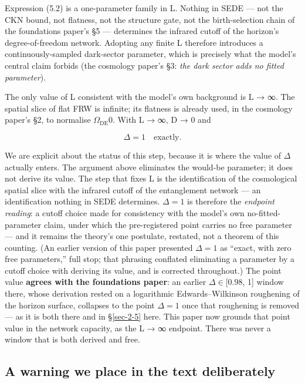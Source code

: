 \documentclass[aps,prd,preprint,nofootinbib,superscriptaddress]{revtex4-2}
\begin{document}
Expression (5.2) is a one-parameter family in L. Nothing in SEDE --- not
the CKN bound, not flatness, not the structure gate, not the
birth-selection chain of the foundations paper's §5 --- determines the
infrared cutoff of the horizon's degree-of-freedom network. Adopting any
finite L therefore introduces a continuously-sampled dark-sector
parameter, which is precisely what the model's central claim forbids
(the cosmology paper's §3: \emph{the dark sector adds no fitted
parameter}).

The only value of L consistent with the model's own background is L → ∞.
The spatial slice of flat FRW is infinite; its flatness is already used,
in the cosmology paper's §2, to normalise \(\Omega _\mathrm{DE}0\). With
L → ∞, D → 0 and

\begin{equation}\Delta = 1 \quad\text{exactly.} \tag{5.3}\end{equation}

We are explicit about the status of this step, because it is where the
value of \(\Delta\) actually enters. The argument above eliminates the
would-be parameter; it does not derive its value. The step that fixes L
is the identification of the cosmological spatial slice with the
infrared cutoff of the entanglement network --- an identification
nothing in SEDE determines. \(\Delta  = 1\) is therefore the
\emph{endpoint reading}: a cutoff choice made for consistency with the
model's own no-fitted-parameter claim, under which the pre-registered
point carries no free parameter --- and it remains the theory's one
postulate, restated, not a theorem of this counting. (An earlier version
of this paper presented \(\Delta  = 1\) as ``exact, with zero free
parameters,'' full stop; that phrasing conflated eliminating a parameter
by a cutoff choice with deriving its value, and is corrected
throughout.) The point value \textbf{agrees with the foundations paper}:
an earlier \(\Delta  \in  [0.98\), 1{]} window there, whose derivation
rested on a logarithmic Edwards--Wilkinson roughening of the horizon
surface, collapses to the point \(\Delta  = 1\) once that roughening is
removed --- as it is both there and in §\ref{sec-2-5} here. This paper
now grounds that point value in the network capacity, as the L → ∞
endpoint. There was never a window that is both derived and free.

\subsection{A warning we place in the text deliberately}\label{sec-5-4}
\end{document}
